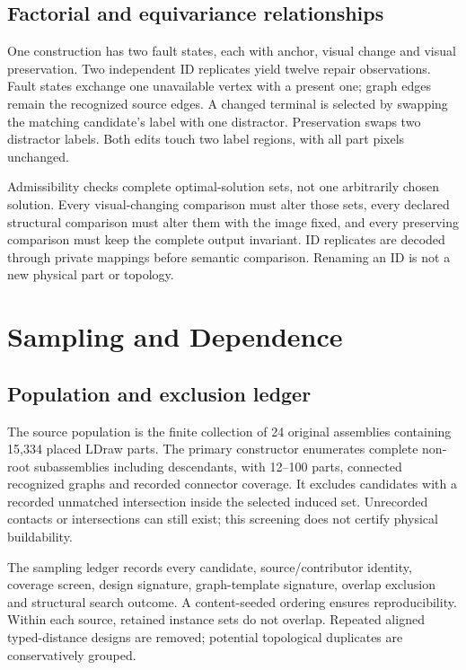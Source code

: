 \documentclass[10pt,twocolumn,letterpaper]{article}
\begin{document}
\subsection{Factorial and equivariance relationships}
One construction has two fault states, each with anchor, visual
change and visual preservation. Two independent ID replicates
yield twelve repair observations. Fault states exchange one
unavailable vertex with a present one; graph edges remain the
recognized source edges. A changed terminal is selected by swapping
the matching candidate's label with one distractor. Preservation
swaps two distractor labels. Both edits touch two label regions,
with all part pixels unchanged.

Admissibility checks complete optimal-solution sets, not one
arbitrarily chosen solution. Every visual-changing comparison must
alter those sets, every declared structural comparison must alter
them with the image fixed, and every preserving comparison must
keep the complete output invariant. ID replicates are decoded
through private mappings before semantic comparison.
Renaming an ID is not a new physical part or topology.

\section{Sampling and Dependence}
\subsection{Population and exclusion ledger}
The source population is the finite collection of 24 original
assemblies containing 15,334 placed LDraw parts. The primary
constructor enumerates complete non-root subassemblies including
descendants, with 12--100 parts, connected recognized graphs and
recorded connector coverage. It excludes candidates with a
recorded unmatched intersection inside the selected induced set.
Unrecorded contacts or intersections can still exist; this
screening does not certify physical buildability.

The sampling ledger records every candidate, source/contributor
identity, coverage screen, design signature, graph-template signature,
overlap exclusion and structural search outcome.
A content-seeded ordering ensures reproducibility.
Within each source, retained instance sets do not overlap.
Repeated aligned typed-distance designs are removed; potential
topological duplicates are conservatively grouped.

\begin{table}[t]
\centering\small
\caption{Primary construction coverage generated from the actual
selection ledger. Sources or groups with no admitted construction
do not reappear as additional independent observations.}
\label{tab:sources}

\end{table}
\end{document}
